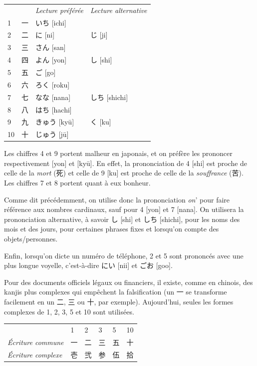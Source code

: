 \documentclass[a4paper,11pt,final]{article}
\newcommand{\sectit}[1]{\bigskip\hspace{-5mm}{\color{sectionblue}%
$\blacksquare$~~\Large\bfseries #1}}
\newcommand{\romaji}[1]{{\footnotesize[#1]}}
\begin{document}
\hspace{5mm}\begin{tabular}{|p{1.5cm}p{1.5cm}p{3cm}p{3cm}}
    \multicolumn{1}{l}{}&& \it\small Lecture préférée &
    \it\small Lecture alternative \\
    1    & 一    & いち \romaji{ichi} \\
    2    & 二    & に \romaji{ni}            & じ \romaji{ji} \\
    3    & 三    & さん \romaji{san} \\
    4    & 四    & よん \romaji{yon}        & し \romaji{shi} \\
    5    & 五    & ご \romaji{go} \\
    6    & 六    & ろく \romaji{roku} \\
    7    & 七    & なな \romaji{nana}       & しち \romaji{shichi} \\
    8    & 八    & はち \romaji{hachi} \\
    9    & 九    & きゅう \romaji{ky\=u}   & く \romaji{ku} \\
    10   & 十    & じゅう \romaji{j\=u}
\end{tabular}

Les chiffres 4 et 9 portent malheur en japonais, et on préfère les prononcer
respectivement \romaji{yon} et \romaji{ky\=u}. En effet, la prononciation de 4
\romaji{shi} est proche de celle de la \textit{mort} (死) et celle de 9
\romaji{ku} est proche de celle de la \textit{souffrance} (苦). Les chiffres 7
et 8 portent quant à eux bonheur.


\sectit{Prononciation}

Comme dit précédemment, on utilise donc la prononciation \textit{on}' pour
faire référence aux nombres cardinaux, sauf pour 4 \romaji{yon} et 7
\romaji{nana}. On utilisera la prononciation alternative, à savoir し
\romaji{shi} et しち \romaji{shichi}, pour les noms des mois et des jours, pour
certaines phrases fixes et lorsqu'on compte des objets/personnes.

Enfin, lorsqu'on dicte un numéro de téléphone, 2 et 5 sont prononcés avec une
plus longue voyelle, c'est-à-dire にい \romaji{nii} et ごお \romaji{goo}.


\sectit{Écriture}

Pour des documents officiels légaux ou financiers, il existe, comme en chinois,
des kanjis plus complexes qui empêchent la falsification (un 一 se transforme
facilement en un 二, 三 ou 十, par exemple). Aujourd'hui, seules les formes
complexes de 1, 2, 3, 5 et 10 sont utilisées.

\hspace{5mm}\begin{tabular}{|l*{4}{p{1cm}}}
     & 1 & 2 & 3 & 5 & 10 \\
    \it\small Écriture commune & 一 & 二 & 三 & 五 & 十 \\
    \it\small Écriture complexe & 壱 & 弐 & 参 & 伍 & 拾
\end{tabular}
\end{document}
